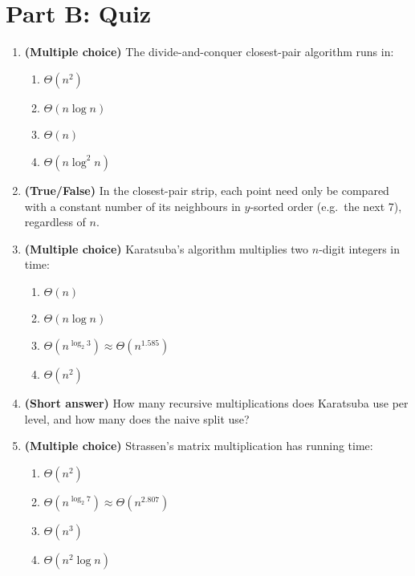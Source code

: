 \documentclass[11pt]{article}
\begin{document}
\newpage
\section*{Part B: Quiz}

\begin{enumerate}[label=\textbf{B\arabic*.}, leftmargin=2.2em]

\item \textbf{(Multiple choice)} The divide-and-conquer closest-pair algorithm runs in:
\begin{enumerate}[label=(\alph*)]
    \item $\Theta(n^2)$
    \item $\Theta(n \log n)$
    \item $\Theta(n)$
    \item $\Theta(n \log^2 n)$
\end{enumerate}

\item \textbf{(True/False)} In the closest-pair strip, each point need only be compared with a
constant number of its neighbours in $y$-sorted order (e.g.\ the next 7), regardless of $n$.

\item \textbf{(Multiple choice)} Karatsuba's algorithm multiplies two $n$-digit integers in
time:
\begin{enumerate}[label=(\alph*)]
    \item $\Theta(n)$
    \item $\Theta(n \log n)$
    \item $\Theta(n^{\log_2 3}) \approx \Theta(n^{1.585})$
    \item $\Theta(n^2)$
\end{enumerate}

\item \textbf{(Short answer)} How many recursive multiplications does Karatsuba use per level,
and how many does the naive split use?

\item \textbf{(Multiple choice)} Strassen's matrix multiplication has running time:
\begin{enumerate}[label=(\alph*)]
    \item $\Theta(n^2)$
    \item $\Theta(n^{\log_2 7}) \approx \Theta(n^{2.807})$
    \item $\Theta(n^3)$
    \item $\Theta(n^2 \log n)$
\end{enumerate}


\end{enumerate}
\end{document}
